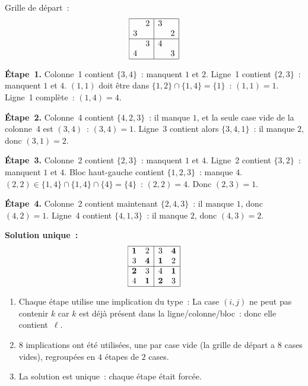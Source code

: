 
Grille de d\'epart~:
\[
\begin{array}{|cc|cc|}
\hline
  & 2 & 3 &   \\
3 &   &   & 2 \\
\hline
  & 3 & 4 &   \\
4 &   &   & 3 \\
\hline
\end{array}
\]

\textbf{\'Etape~1.} Colonne~1 contient $\{3,4\}$~: manquent $1$ et $2$.
Ligne~1 contient $\{2,3\}$~: manquent $1$ et $4$.
$(1,1)$ doit \^etre dans $\{1,2\}\cap\{1,4\}=\{1\}$~: \textbf{$(1,1)=1$}.
Ligne~1 compl\`ete~: $(1,4)=4$.

\textbf{\'Etape~2.} Colonne~4 contient $\{4,2,3\}$~: il manque $1$, et la seule case vide
de la colonne~4 est $(3,4)$~: \textbf{$(3,4)=1$}.
Ligne~3 contient alors $\{3,4,1\}$~: il manque $2$, donc \textbf{$(3,1)=2$}.

\textbf{\'Etape~3.} Colonne~2 contient $\{2,3\}$~: manquent $1$ et $4$.
Ligne~2 contient $\{3,2\}$~: manquent $1$ et $4$.
Bloc haut-gauche contient $\{1,2,3\}$~: manque $4$.
$(2,2)\in\{1,4\}\cap\{1,4\}\cap\{4\}=\{4\}$~: \textbf{$(2,2)=4$}. Donc $(2,3)=1$.

\textbf{\'Etape~4.} Colonne~2 contient maintenant $\{2,4,3\}$~: il manque $1$,
donc \textbf{$(4,2)=1$}.
Ligne~4 contient $\{4,1,3\}$~: il manque $2$, donc \textbf{$(4,3)=2$}.

\textbf{Solution unique~:}
\[
\begin{array}{|cc|cc|}
\hline
\mathbf{1} & 2 & 3 & \mathbf{4} \\
3 & \mathbf{4} & \mathbf{1} & 2 \\
\hline
\mathbf{2} & 3 & 4 & \mathbf{1} \\
4 & \mathbf{1} & \mathbf{2} & 3 \\
\hline
\end{array}
\]

\begin{enumerate}
  \item Chaque \'etape utilise une implication du type~:
        \og La case $(i,j)$ ne peut pas contenir $k$ car $k$ est
        d\'ej\`a pr\'esent dans la ligne/colonne/bloc~: donc elle contient~$\ell$.\fg
  \item $8$ implications ont \'et\'e utilis\'ees, une par case vide
        (la grille de d\'epart a $8$ cases vides), regroup\'ees en $4$ \'etapes de $2$ cases.
  \item La solution est unique~: chaque \'etape \'etait forc\'ee.
\end{enumerate}

